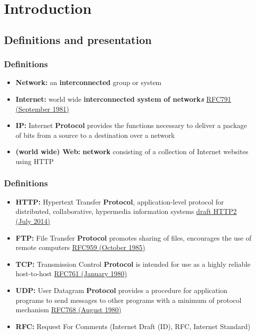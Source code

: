 \section{Introduction}
\subsection{Definitions and presentation}
  \begin{frame}
    \frametitle{Definitions}
      \begin{itemize}
        \item \textbf{Network:} an \textbf{interconnected} group or system\pause
        \item \textbf{Internet:} world wide \textbf{interconnected system of network\emph{s}} \color{blue}\href{http://tools.ietf.org/html/rfc791}{RFC791 (September 1981)}\color{black}\pause
        \item \textbf{IP:} Internet \textbf{Protocol} provides the functions necessary to deliver a package of bits from a source to a destination over a network\pause
        \item \textbf{(world wide) Web:} \textbf{network} consisting of a collection of Internet websites using HTTP
      \end{itemize}
  \end{frame}
  \begin{frame}
    \frametitle{Definitions}
      \begin{itemize}
        \item \textbf{HTTP:} Hypertext Transfer \textbf{Protocol}, application-level protocol for distributed, collaborative, hypermedia information systems \color{blue}\href{http://tools.ietf.org/html/draft-ietf-httpbis-http2-14}{draft HTTP2 (July 2014)} \color{black}\pause
        \item \textbf{FTP:} File Transfer \textbf{Protocol} promotes sharing of files, encourages the use of remote computers \color{blue}\href{http://tools.ietf.org/html/rfc959}{RFC959 (October 1985)} \color{black} \pause
        \item \textbf{TCP:} Transmission Control \textbf{Protocol} is intended for use as a highly reliable host-to-host \color{blue}\href{http://tools.ietf.org/html/rfc761}{RFC761 (January 1980)} \color{black} \pause
        \item \textbf{UDP:} User Datagram \textbf{Protocol} provides  a procedure  for application  programs  to send messages  to other programs  with a minimum  of protocol mechanism \color{blue}\href{http://tools.ietf.org/html/rfc768}{RFC768 (August 1980)} \color{black} \pause
        \item \textbf{RFC:} Request For Comments (Internet Draft (ID), RFC, Internet Standard)
      \end{itemize}
  \end{frame}
